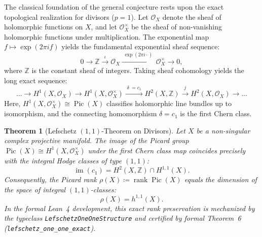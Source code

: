 \documentclass[11pt,a4paper]{article}
\theoremstyle{definition}
\theoremstyle{plain}
\newtheorem{theorem}[definition]{Theorem}
\DeclareMathOperator{\im}{im}
\DeclareMathOperator{\Pic}{Pic}
\begin{document}
The classical foundation of the general conjecture rests upon the exact topological realization for divisors ($p = 1$). Let $\mathcal{O}_X$ denote the sheaf of holomorphic functions on $X$, and let $\mathcal{O}_X^\times$ be the sheaf of non-vanishing holomorphic functions under multiplication. The exponential map $f \mapsto \exp(2\pi i f)$ yields the fundamental exponential sheaf sequence:
\begin{equation}
    \label{eq:exponential_sequence}
    0 \longrightarrow \mathbb{Z} \xrightarrow{\; \iota \;} \mathcal{O}_X \xrightarrow{\; \exp(2\pi i \cdot) \;} \mathcal{O}_X^\times \longrightarrow 0,
\end{equation}
where $\mathbb{Z}$ is the constant sheaf of integers. Taking sheaf cohomology yields the long exact sequence:
\begin{equation}
    \label{eq:sheaf_cohomology_long_exact}
    \dots \longrightarrow H^1(X, \mathcal{O}_X) \longrightarrow H^1(X, \mathcal{O}_X^\times) \xrightarrow{\; \delta \;= c_1 \;} H^2(X, \mathbb{Z}) \xrightarrow{\; j \; } H^2(X, \mathcal{O}_X) \longrightarrow \dots
\end{equation}
Here, $H^1(X, \mathcal{O}_X^\times) \cong \Pic(X)$ classifies holomorphic line bundles up to isomorphism, and the connecting homomorphism $\delta = c_1$ is the first Chern class.

\begin{theorem}[Lefschetz $(1,1)$-Theorem on Divisors]
\label{thm:lefschetz_one_one}
Let $X$ be a non-singular complex projective manifold. The image of the Picard group $\Pic(X) \cong H^1(X, \mathcal{O}_X^\times)$ under the first Chern class map coincides precisely with the integral Hodge classes of type $(1,1)$:
\begin{equation}
    \label{eq:lefschetz_one_one_picard}
    \im(c_1) = H^2(X, \mathbb{Z}) \cap H^{1,1}(X).
\end{equation}
Consequently, the Picard rank $\rho(X) \coloneqq \operatorname{rank} \Pic(X)$ equals the dimension of the space of integral $(1,1)$-classes:
\begin{equation}
    \label{eq:lefschetz_one_one_rank}
    \rho(X) = h^{1,1}(X).
\end{equation}
In the formal Lean~4 development, this exact rank preservation is mechanized by the typeclass \texttt{LefschetzOneOneStructure} and certified by formal Theorem~6 (\texttt{lefschetz\_one\_one\_exact}).
\end{theorem}
\end{document}
